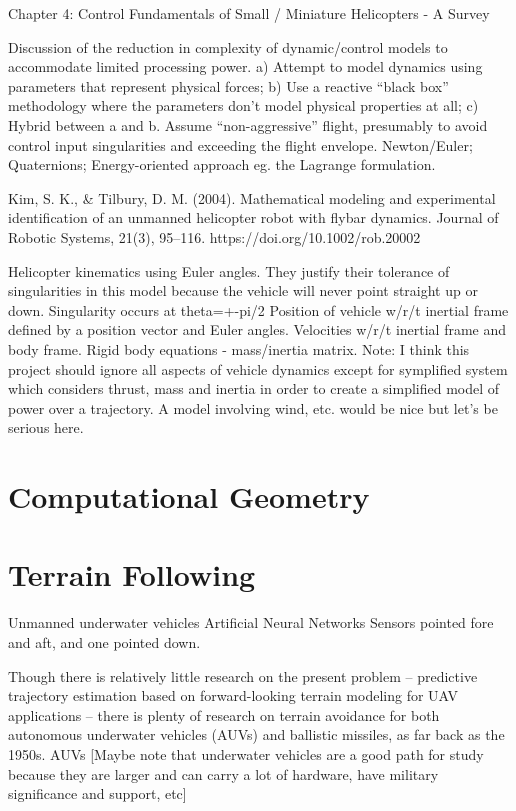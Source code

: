 Chapter 4: Control Fundamentals of Small / Miniature Helicopters - A Survey

Discussion of the reduction in complexity of dynamic/control models to accommodate limited processing power. 
a) Attempt to model dynamics using parameters that represent physical forces; b) Use a reactive “black box” methodology where the parameters don’t model physical properties at all; c) Hybrid between a and b.
Assume “non-aggressive” flight, presumably to avoid control input singularities and exceeding the flight envelope.
Newton/Euler; Quaternions; Energy-oriented approach eg. the Lagrange formulation.

\cite{Kim2004}
Kim, S. K., \& Tilbury, D. M. (2004). Mathematical modeling and experimental identification of an unmanned helicopter robot with flybar dynamics. Journal of Robotic Systems, 21(3), 95–116. https://doi.org/10.1002/rob.20002

Helicopter kinematics using Euler angles. They justify their tolerance of singularities in this model because the vehicle will never point straight up or down. Singularity occurs at theta=+-pi/2
Position of vehicle w/r/t inertial frame defined by a position vector and Euler angles.
Velocities w/r/t inertial frame and body frame.
Rigid body equations - mass/inertia matrix.
Note: I think this project should ignore all aspects of vehicle dynamics except for symplified system which considers thrust, mass and inertia in order to create a simplified model of power over a trajectory. A model involving wind, etc. would be nice but let’s be serious here.


\section{Computational Geometry}



\section{Terrain Following}

Unmanned underwater vehicles
Artificial Neural Networks
Sensors pointed fore and aft, and one pointed down.

Though there is relatively little research on the present problem -- predictive trajectory estimation based on forward-looking terrain modeling for UAV applications -- there is plenty of research on terrain avoidance for both autonomous underwater vehicles (AUVs) and ballistic missiles, as far back as the 1950s. 
AUVs
[Maybe note that underwater vehicles are a good path for study because they are larger and can carry a lot of hardware, have military significance and support, etc]

